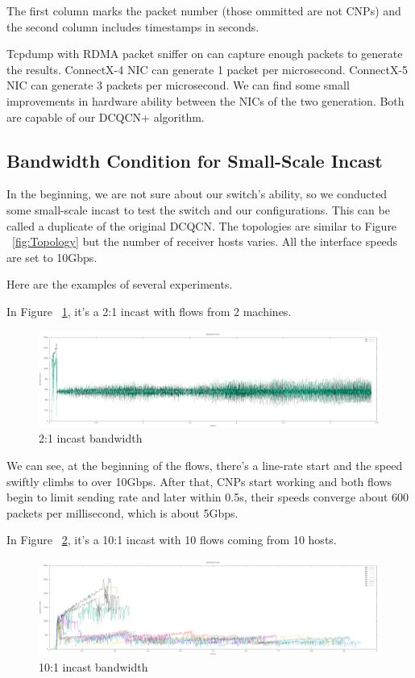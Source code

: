 \documentclass[12pt,a4paper]{article}
\begin{document}
The first column marks the packet number (those ommitted are not CNPs) and the second column includes timestamps in seconds.

Tcpdump with RDMA packet sniffer on can capture enough packets to generate the results.
ConnectX-4 NIC can generate 1 packet per microsecond.
ConnectX-5 NIC can generate 3 packets per microsecond.
We can find some small improvements in hardware ability between the NICs of the two generation.
Both are capable of our DCQCN+ algorithm.

\subsection{Bandwidth Condition for Small-Scale Incast}
In the beginning, we are not sure about our switch's ability, so we conducted some small-scale incast to test the switch and our configurations.
This can be called a duplicate of the original DCQCN.
The topologies are similar to Figure ~\ref{fig:Topology} but the number of receiver hosts varies.
All the interface speeds are set to 10Gbps.

Here are the examples of several experiments.

In Figure ~\ref{fig:2on1_1}, it's a 2:1 incast with flows from 2 machines.

\begin{figure}[ht]
	\begin{center}
		\includegraphics[width=6in]{2on1_1}
		\caption{2:1 incast bandwidth}
		\label{fig:2on1_1}
	\end{center}
\end{figure}

We can see, at the beginning of the flows, there's a line-rate start and the speed swiftly climbs to over 10Gbps.
After that, CNPs start working and both flows begin to limit sending rate and later within 0.5s, their speeds converge about
600 packets per millisecond, which is about 5Gbps.

In Figure ~\ref{fig:10on1_1}, it's a 10:1 incast with 10 flows coming from 10 hosts.

\begin{figure}[ht]
	\begin{center}
		\includegraphics[width=6in]{10on1_1}
		\caption{10:1 incast bandwidth}
		\label{fig:10on1_1}
	\end{center}
\end{figure}
\end{document}
